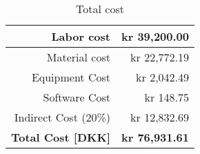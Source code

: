 \begin{table}[htbp]
\caption{Software cost}
\begin{center}
\end{center}
\label{tab:sofware_cost}
\end{table}

\begin{table}[htbp]
\caption{Total cost}
\begin{center}
\begin{tabular}{r|r}
Labor cost & kr 39,200.00 \\ \hline
Material cost & kr 22,772.19 \\ \hline
Equipment Cost & kr 2,042.49 \\ \hline
Software Cost & kr 148.75 \\ \hline
Indirect Cost (20\%) & kr 12,832.69 \\ \hhline{=|=}
\textbf{Total Cost [DKK]} & \textbf{kr 76,931.61} \\ 
\end{tabular}
\end{center}
\label{tab:total_cost}
\end{table}

